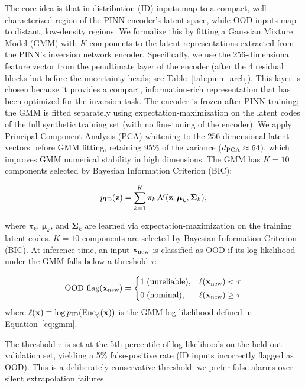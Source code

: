 \documentclass[usenatbib]{mnras}
\begin{document}
The core idea is that in-distribution (ID) inputs map to a compact, well-characterized region of the PINN encoder's latent space, while OOD inputs map to distant, low-density regions. We formalize this by fitting a Gaussian Mixture Model (GMM) with $K$ components to the latent representations extracted from the PINN's inversion network encoder. Specifically, we use the 256-dimensional feature vector from the penultimate layer of the encoder (after the 4 residual blocks but before the uncertainty heads; see Table~\ref{tab:pinn_arch}). This layer is chosen because it provides a compact, information-rich representation that has been optimized for the inversion task. The encoder is frozen after PINN training; the GMM is fitted separately using expectation-maximization on the latent codes of the full synthetic training set (with no fine-tuning of the encoder). We apply Principal Component Analysis (PCA) whitening to the 256-dimensional latent vectors before GMM fitting, retaining 95\% of the variance ($d_{\rm PCA} \approx 64$), which improves GMM numerical stability in high dimensions. The GMM has $K=10$ components selected by Bayesian Information Criterion (BIC):

\begin{equation}\label{eq:gmm}
p_{\rm ID}(\mathbf{z}) = \sum_{k=1}^{K} \pi_k \, \mathcal{N}(\mathbf{z}; \boldsymbol{\mu}_k, \boldsymbol{\Sigma}_k),
\end{equation}

where $\pi_k$, $\boldsymbol{\mu}_k$, and $\boldsymbol{\Sigma}_k$ are learned via expectation-maximization on the training latent codes. $K=10$ components are selected by Bayesian Information Criterion (BIC). At inference time, an input $\mathbf{x}_{\rm new}$ is classified as OOD if its log-likelihood under the GMM falls below a threshold $\tau$:

\begin{equation}\label{eq:ood_flag}
\text{OOD flag}(\mathbf{x}_{\rm new}) =
\begin{cases}
1 \; \text{(unreliable)}, & \ell(\mathbf{x}_{\rm new}) < \tau \\[2pt]
0 \; \text{(nominal)},   & \ell(\mathbf{x}_{\rm new}) \geq \tau
\end{cases}
\end{equation}
where $\ell(\mathbf{x}) \equiv \log p_{\rm ID}(\text{Enc}_\phi(\mathbf{x}))$ is the GMM log-likelihood defined in Equation~\ref{eq:gmm}.

The threshold $\tau$ is set at the 5th percentile of log-likelihoods on the held-out validation set, yielding a 5\% false-positive rate (ID inputs incorrectly flagged as OOD). This is a deliberately conservative threshold: we prefer false alarms over silent extrapolation failures.
\end{document}
